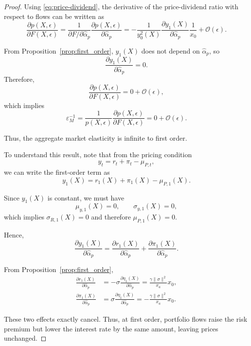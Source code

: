 \begin{proof}

Using \eqref{eq:price-dividend}, the derivative of the price-dividend ratio with respect to flows can be written as
\begin{equation}\label{eq:elasticity_first-order}
\frac{\partial p(X,\epsilon)}{\partial F(X,\epsilon)}
=
\frac{1}{\partial F / \partial \hat{\alpha}_p}
\frac{\partial p(X,\epsilon)}{\partial \hat{\alpha}_p}
=
-\frac{1}{y_0^2(X)}\frac{\partial y_1(X)}{\partial \hat{\alpha}_p}\frac{1}{x_0}
+ \mathcal{O}(\epsilon).
\end{equation}

From Proposition~\ref{prop:first_order}, $y_1(X)$ does not depend on $\hat{\alpha}_p$, so
\[
\frac{\partial y_1(X)}{\partial \hat{\alpha}_p} = 0.
\]
Therefore,
\[
\frac{\partial p(X,\epsilon)}{\partial F(X,\epsilon)} = 0 + \mathcal{O}(\epsilon),
\]
which implies
\[
\varepsilon_M^{-1}
=
\frac{1}{p(X,\epsilon)}
\frac{\partial p(X,\epsilon)}{\partial F(X,\epsilon)}
=
0 + \mathcal{O}(\epsilon).
\]

Thus, the aggregate market elasticity is infinite to first order.

To understand this result, note that from the pricing condition
\[
y_t = r_t + \pi_t - \mu_{P,t},
\]
we can write the first-order term as
\[
y_1(X) = r_1(X) + \pi_1(X) - \mu_{P,1}(X).
\]

Since $y_1(X)$ is constant, we must have
\[
\mu_{y,1}(X) = 0, \qquad \sigma_{y,1}(X) = 0,
\]
which implies $\sigma_{R,1}(X)=0$ and therefore $\mu_{P,1}(X)=0$.

Hence,
\[
\frac{\partial y_1(X)}{\partial \hat{\alpha}_p}
=
\frac{\partial r_1(X)}{\partial \hat{\alpha}_p}
+
\frac{\partial \pi_1(X)}{\partial \hat{\alpha}_p}.
\]

From Proposition~\ref{prop:first_order},
\begin{align*}
\frac{\partial r_1(X)}{\partial \hat{\alpha}_p}
&= -\sigma \frac{\partial \eta_1(X)}{\partial \hat{\alpha}_p}
= \frac{\gamma \|\sigma\|^2}{x_a} x_0, \\
\frac{\partial \pi_1(X)}{\partial \hat{\alpha}_p}
&= \sigma \frac{\partial \eta_1(X)}{\partial \hat{\alpha}_p}
= -\frac{\gamma \|\sigma\|^2}{x_a} x_0.
\end{align*}

These two effects exactly cancel.
Thus, at first order, portfolio flows raise the risk premium but lower the interest rate by the same amount, leaving prices unchanged.

\medskip


\end{proof}
